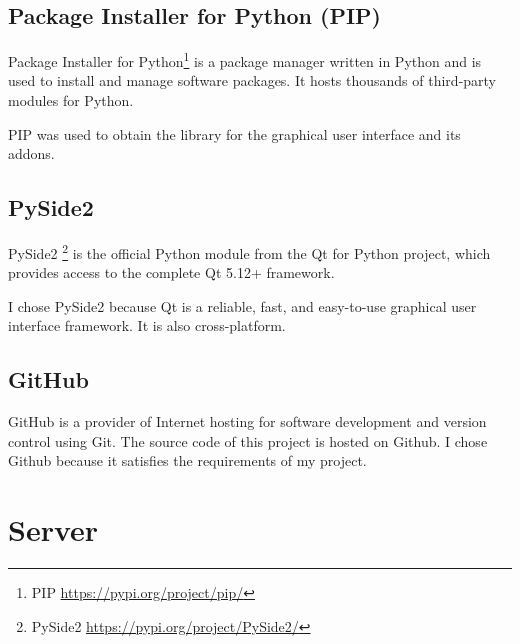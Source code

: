 \subsection{Package Installer for Python (PIP)}
Package Installer for Python\footnote{PIP \url{https://pypi.org/project/pip/}} is a package manager written in Python and is used to install and manage software packages. It hosts thousands of third-party modules for Python.
\par
PIP was used to obtain the library for the graphical user interface and its addons.
\subsection{PySide2}
PySide2 \footnote{PySide2 \url{https://pypi.org/project/PySide2/}} is the official Python module from the Qt for Python project, which provides access to the complete Qt 5.12+ framework.
\par
I chose PySide2 because Qt is a reliable, fast, and easy-to-use graphical user interface framework. It is also cross-platform.
\subsection{GitHub}
GitHub is a provider of Internet hosting for software development and version control using Git. The source code of this project is hosted on Github. I chose Github because it satisfies the requirements of my project.
\newpage
\section{Server}
